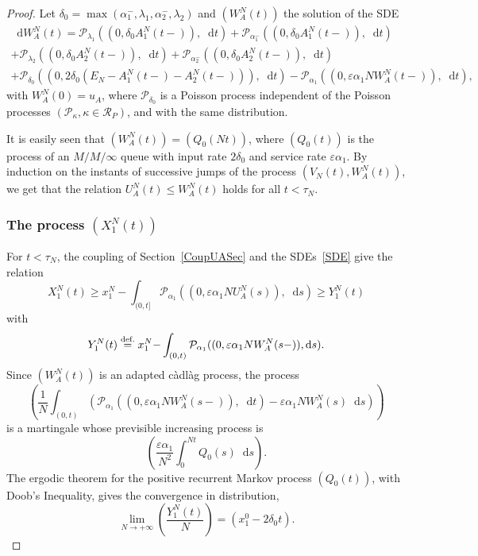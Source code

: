 \documentclass[english]{amsart}
\newcommand{\diff}{\mathop{}\mathopen{}\mathrm{d}}
\newcommand{\cal}[1]{\ensuremath{\mathcal{#1}}}
\newcommand\steq[1]{\stackrel{\text{\rm #1.}}{=}}
\def\eps{\varepsilon}
\def\cadlag{c\`adl\`ag }
\numberwithin{proposition}{section}
\begin{document}
\begin{proof}
Let $\delta_0=\max(\alpha_1^-,\lambda_1,\alpha_2^-,\lambda_2)$ and $(W_A^N(t))$ the solution of the SDE
\begin{multline}\label{WA}
\diff W_A^N(t)=\cal{P}_{\lambda_1}((0, \delta_0 A_1^N(t{-})), \diff t) 
{+}\cal{P}_{\alpha_1^-}((0, \delta_0 A_1^N(t{-})), \diff t) \\
{+}\cal{P}_{\lambda_2}((0, \delta_0 A_2^N(t{-})), \diff t)
{+}\cal{P}_{\alpha_2^-}((0, \delta_0 A_2^N(t{-})), \diff t)\\
{+}\cal{P}_{\delta_0}((0, 2\delta_0 (E_N{-}A_1^N(t{-}){-}A_2^N(t{-}))), \diff t)
{-}\cal{P}_{\alpha_1}((0,\eps\alpha_1NW_A^N(t{-})), \diff t),
\end{multline}
with $W_A^N(0){=}u_A$, where $\cal{P}_{\delta_0}$ is a Poisson process independent of the Poisson processes $({\cal P}_\kappa, \kappa{\in}{\cal R}_P)$, and with the same distribution. 

It is easily seen that $(W_A^N(t)){=}(Q_{0}(Nt))$, where $(Q_0(t))$ is the process of an $M/M/\infty$ queue with input rate $2\delta_0$ and service rate $\eps\alpha_1$.  By induction on the instants of successive jumps of the process $(V_N(t),W_A^N(t))$, we get that the relation $U_A^N(t){\le}W_A^N(t)$ holds for all $t{<}\tau_N$.

\subsubsection{The  process $(X_1^N(t))$}\label{CoupX1Sec}
For $t{<}\tau_N$, the coupling of Section~\ref{CoupUASec} and the SDEs~\eqref{SDE} give the relation
\[
  X_1^N(t)\ge x_1^N-\int_{(0,t]}{\cal P}_{\alpha_1}((0,\eps \alpha_1NU_A^N(s)),\diff s)\ge  Y_1^N(t)
      \]
      with
\[
 Y_1^N(t)\steq{def} x_1^N{-}\int_{(0,t)}\cal{P}_{\alpha_1}((0,\eps\alpha_1NW_A^N(s{-})), \diff s).
\]
Since $(W_A^N(t))$ is an adapted \cadlag process, the process 
\[
 \left(\frac{1}{N}\int_{(0,t)}\left(\cal{P}_{\alpha_1}((0,\eps\alpha_1NW_A^N(s{-})), \diff t)-\eps\alpha_1 N W_A^N(s)\diff s\right)\right)
\]
is a martingale whose previsible increasing process is
\[
\left(\frac{\eps\alpha_1}{N^2}\int_0^{Nt} Q_0(s)\diff s\right).
\]
The ergodic theorem for the positive recurrent Markov process $(Q_0(t))$, with Doob's Inequality, gives  the convergence in distribution,
\begin{equation}\label{Coupeq1}
\lim_{N\to+\infty}  \left(\frac{Y_1^N(t)}{N}\right)=\left(x_1^0-2\delta_0t\right).
\end{equation}



\end{proof}
\end{document}
